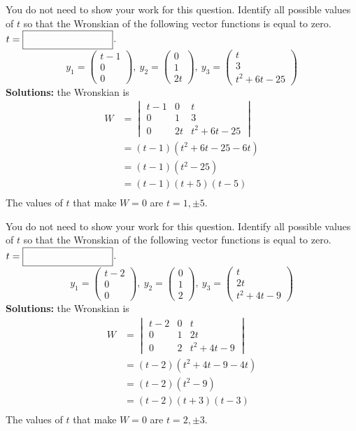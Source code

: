 \ifnum {}
\question[2] You do not need to show your work for this question. Identify all possible values of $t$ so that the Wronskian of the following vector functions is equal to zero. $t = \framebox{\strut\hspace{3cm}}$. 
$$y_1 = \begin{pmatrix} t-1\\0\\0\end{pmatrix}, \ y_2 = \begin{pmatrix} 0\\1\\2t\end{pmatrix}, \ y_3 = \begin{pmatrix} t\\3\\t^2+6t-25 \end{pmatrix}$$
\ifnum {} {\color{DarkBlue} 
\textbf{Solutions:} the Wronskian is
\begin{align}
    W &= \begin{vmatrix} t-1&0&t\\0&1&3\\0&2t&t^2+6t-25 \end{vmatrix} \\
    &= (t-1)\left( t^2+6t- 25 - 6t\right) \\
    &= (t-1)\left( t^2-25\right) \\
    &= (t-1)(t+5)(t-5) \\
\end{align}
The values of $t$ that make $W=0$ are $t = 1,\pm 5$.
} 
\else 
\fi
\fi

\ifnum {}
\question[2] You do not need to show your work for this question. Identify all possible values of $t$ so that the Wronskian of the following vector functions is equal to zero. $t = \framebox{\strut\hspace{3cm}}$. 
$$y_1 = \begin{pmatrix} t-2\\0\\0\end{pmatrix}, \ y_2 = \begin{pmatrix} 0\\1\\2\end{pmatrix}, \ y_3 = \begin{pmatrix} t\\2t\\t^2+4t-9 \end{pmatrix}$$
\ifnum {} {\color{DarkBlue} 
\textbf{Solutions:} the Wronskian is
\begin{align}
    W &= \begin{vmatrix} t-2&0&t\\0&1&2t\\0&2&t^2+4t-9 \end{vmatrix} \\
    &= (t-2)\left( t^2+4t-9 - 4t\right) \\
    &= (t-2)\left( t^2-9\right) \\
    &= (t-2)(t+3)(t-3) \\
\end{align}
The values of $t$ that make $W=0$ are $t = 2,\pm 3$.
} 
\else 
\fi
\fi

